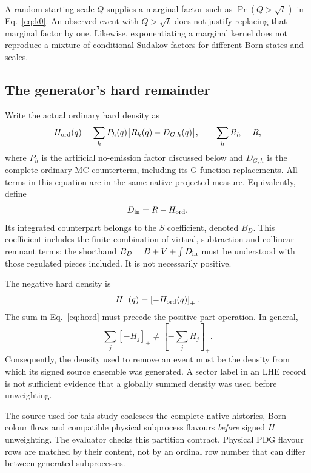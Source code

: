 \documentclass[11pt,a4paper]{article}
\newcommand{\pos}[1]{\left[#1\right]_+}
\begin{document}
A random starting scale $Q$ supplies a marginal factor such as
$\Pr(Q>\sqrt t)$ in Eq.~\eqref{eq:k0}. An observed event with
$Q>\sqrt t$ does not justify replacing that marginal factor by one.
Likewise, exponentiating a marginal kernel does not reproduce a mixture
of conditional Sudakov factors for different Born states and scales.

\subsection{The generator's hard remainder}
\label{sec:ordinary}
Write the actual ordinary hard density as
\begin{equation}
 H_{\rm ord}(q)=\sum_h P_h(q)
       \bigl[R_h(q)-D_{G,h}(q)\bigr],
 \qquad \sum_h R_h=R,
 \label{eq:hord}
\end{equation}
where $P_h$ is the artificial no-emission factor discussed below and
$D_{G,h}$ is the complete ordinary MC counterterm, including its
G-function replacements. All terms in this equation are in the same
native projected measure. Equivalently, define
\begin{equation}
 D_{\rm in}=R-H_{\rm ord}.
 \label{eq:din}
\end{equation}
Its integrated counterpart belongs to the $S$ coefficient, denoted
$\bar B_D$. This coefficient includes the finite combination of virtual,
subtraction and collinear-remnant terms; the shorthand
$\bar B_D=B+V+\int D_{\rm in}$ must be understood with those regulated
pieces included. It is not necessarily positive.

The negative hard density is
\begin{equation}
 H_-(q)=\pos{-H_{\rm ord}(q)}.
 \label{eq:hminus}
\end{equation}
The sum in Eq.~\eqref{eq:hord} must precede the positive-part operation.
In general,
\begin{equation}
 \sum_j\pos{-H_j}\ne\pos{-\sum_j H_j}.
 \label{eq:partition}
\end{equation}
Consequently, the density used to remove an event must be the density
from which its signed source ensemble was generated. A sector label in
an LHE record is not sufficient evidence that a globally summed density
was used before unweighting.

The source used for this study coalesces the complete native histories, Born-colour
flows and compatible physical subprocess flavours \emph{before} signed
$H$ unweighting. The evaluator checks this partition contract. Physical
PDG flavour rows are matched by their content, not by an ordinal row
number that can differ between generated subprocesses.
\end{document}
